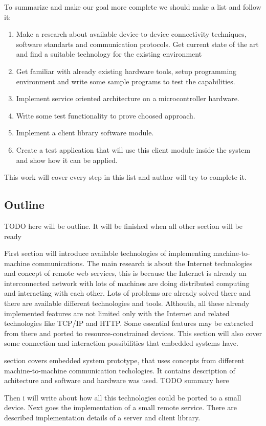 To summarize and make our goal more complete we should make a list and follow
it:
\begin{enumerate}
  \item Make a research about available device-to-device connectivity
  techniques, software standarts and communication protocols. Get current state
  of the art and find a suitable technology for the existing environment
  \item Get familiar with already existing hardware tools, setup programming
  environment and write some sample programs to test the capabilities.
  \item Implement service oriented architecture on a microcontroller hardware.
  \item Write some test functionality to prove choosed approach.
  \item Implement a client library software module.
  \item Create a test application that will use this client module inside the
  system and show how it can be applied. 
\end{enumerate}

This work will cover every step in this list and author will try to complete it. 

\subsection{Outline}
TODO here will be outline. It will be finished when all other section will be
ready

First section will introduce available technologies of implementing
machine-to-machine communications. The main research is about the Internet
technologies and concept of remote web services, this is because the Internet
is already an interconnected network with lots of machines are doing distributed
computing and interacting with each other. Lots of problems are already solved
there and there are available different technologies and tools.
Althouth, all these already implemented features are not limited  only with the
Internet and related technologies like TCP/IP and HTTP. Some essential
features may be extracted from there and ported to resource-constrained devices. This section will also cover some connection and
interaction possibilities that embedded systems have.

 section covers embedded system prototype, that uses
concepts from different machine-to-machine communication techologies. It
contains description of achitecture and software and hardware was used. 
TODO summary here

Then i will write about how all
this technologies could be ported to a small device.
Next goes the implementation of a small remote service. 
There are described implementation details of a server and client library.
